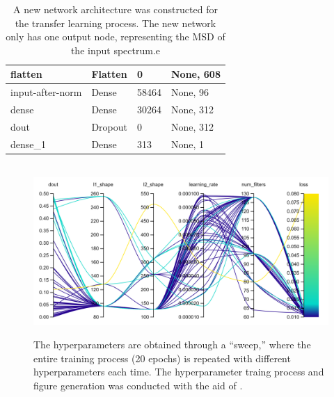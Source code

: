 \begin{table}[]
\begin{tabular}{|l|l|l|l|}
    flatten                             & Flatten                            & 0                                           & None, 608                                  \\ \hline
    input-after-norm                    & Dense                              & 58464                                       & None, 96                                   \\ \hline
    dense                               & Dense                              & 30264                                       & None, 312                                  \\ \hline
    dout                               & Dropout                              & 0                                       & None, 312                                  \\ \hline
    dense\_1                            & Dense                              & 313                                         & None, 1                                    \\ \hline
    \end{tabular}
    \caption{A new network architecture was constructed for the transfer learning process. The new network only has one output node, representing the MSD of the input spectrum.e}
    \label{tab:meta-1}
\end{table}
\egroup

\begin{figure}
    \centering
    \
    \includegraphics[width=\linewidth]{Chapters/Figures/new-hyperparameter-sweep-meta-1.png}
    \label{fig:meta-1-sweep-params}
    \caption[Hyperpamater Sweep 1]{The hyperparameters are obtained through a ``sweep,'' where the entire training process (20 epochs) is repeated with different hyperparameters each time. The hyperparameter traing process and figure generation was conducted with the aid of \cite{wandb}.}
\end{figure}


